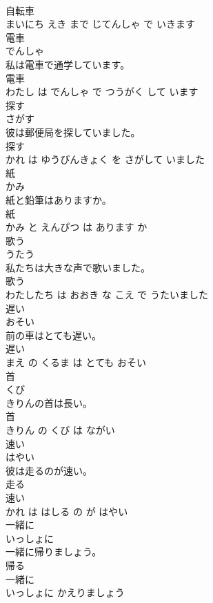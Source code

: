 \documentclass[8pt]{extreport}
\begin{document}
\begin{CJK}{UTF8}{min}
\\	自転車 
\\	まいにち えき まで じてんしゃ で いきます			
\\	電車	
\\	でんしゃ			
\\	私は電車で通学しています。	
\\	電車 
\\	わたし は でんしゃ で つうがく して います			
\\	探す	
\\	さがす			
\\	彼は郵便局を探していました。	
\\	探す 
\\	かれ は ゆうびんきょく を さがして いました			
\\	紙	
\\	かみ			
\\	紙と鉛筆はありますか。	
\\	紙 
\\	かみ と えんぴつ は あります か			
\\	歌う	
\\	うたう			
\\	私たちは大きな声で歌いました。	
\\	歌う 
\\	わたしたち は おおき な こえ で うたいました			
\\	遅い	
\\	おそい			
\\	前の車はとても遅い。	
\\	遅い 
\\	まえ の くるま は とても おそい			
\\	首	
\\	くび			
\\	きりんの首は長い。	
\\	首 
\\	きりん の くび は ながい			
\\	速い	
\\	はやい			
\\	彼は走るのが速い。	
\\	走る 
\\	速い 
\\	かれ は はしる の が はやい			
\\	一緒に	
\\	いっしょに			
\\	一緒に帰りましょう。	
\\	帰る 
\\	一緒に 
\\	いっしょに かえりましょう			

\end{CJK}
\end{document}
